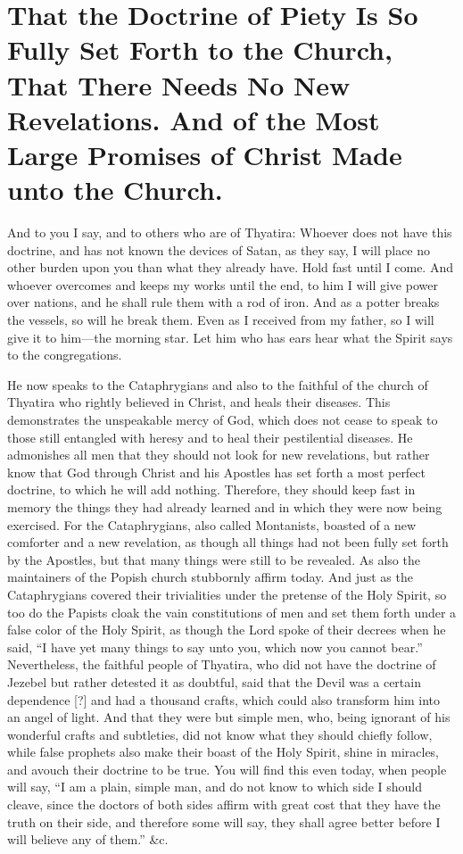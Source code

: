 \chapter[Sermon 14. That the Doctrine of Piety Is So Fully Set Forth to the Church, That There Needs No New Revelations. And of the Most Large Promises of Christ Made unto the Church.]{That the Doctrine of Piety Is So Fully Set Forth to the Church, That There Needs No New Revelations. And of the Most Large Promises of Christ Made unto the Church.}
\label{sermon:014}

And to you I say, and to others who are of Thyatira: Whoever does not have this doctrine, and has not known the devices of Satan, as they say, I will place no other burden upon you than what they already have. Hold fast until I come. And whoever overcomes and keeps my works until the end, to him I will give power over nations, and he shall rule them with a rod of iron. And as a potter breaks the vessels, so will he break them. Even as I received from my father, so I will give it to him—the morning star. Let him who has ears hear what the Spirit says to the congregations.

He now speaks to the Cataphrygians and also to the faithful of the church of Thyatira who rightly believed in Christ, and heals their diseases. This demonstrates the unspeakable mercy of God, which does not cease to speak to those still entangled with heresy and to heal their pestilential diseases. He admonishes all men that they should not look for new revelations, but rather know that God through Christ and his Apostles has set forth a most perfect doctrine, to which he will add nothing. Therefore, they should keep fast in memory the things they had already learned and in which they were now being exercised. For the Cataphrygians, also called Montanists, boasted of a new comforter and a new revelation, as though all things had not been fully set forth by the Apostles, but that many things were still to be revealed. As also the maintainers of the Popish church stubbornly affirm today. And just as the Cataphrygians covered their trivialities under the pretense of the Holy Spirit, so too do the Papists cloak the vain constitutions of men and set them forth under a false color of the Holy Spirit, as though the Lord spoke of their decrees when he said, “I have yet many things to say unto you, which now you cannot bear.” Nevertheless, the faithful people of Thyatira, who did not have the doctrine of Jezebel but rather detested it as doubtful, said that the Devil was a certain dependence [?] and had a thousand crafts, which could also transform him into an angel of light. And that they were but simple men, who, being ignorant of his wonderful crafts and subtleties, did not know what they should chiefly follow, while false prophets also make their boast of the Holy Spirit, shine in miracles, and avouch their doctrine to be true. You will find this even today, when people will say, “I am a plain, simple man, and do not know to which side I should cleave, since the doctors of both sides affirm with great cost that they have the truth on their side, and therefore some will say, they shall agree better before I will believe any of them.” \&c.


